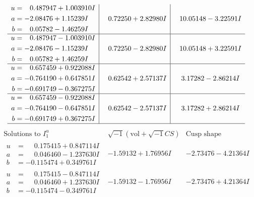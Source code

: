 \documentclass[1p]{elsarticle_modified}
\theoremstyle{definition}
\newcommand{\I}{\sqrt{-1}}
\begin{document}
$$\begin{array}{c|c|c}
\begin{aligned}
u &= \phantom{-}0.487947 + 1.003910 I \\
a &= -2.08476 + 1.15239 I \\
b &= \phantom{-}0.05782 - 1.46259 I\end{aligned}
 & \phantom{-}0.72250 + 2.82980 I & \phantom{-}10.05148 - 3.22591 I \\ \hline\begin{aligned}
u &= \phantom{-}0.487947 - 1.003910 I \\
a &= -2.08476 - 1.15239 I \\
b &= \phantom{-}0.05782 + 1.46259 I\end{aligned}
 & \phantom{-}0.72250 - 2.82980 I & \phantom{-}10.05148 + 3.22591 I \\ \hline\begin{aligned}
u &= \phantom{-}0.657459 + 0.922088 I \\
a &= -0.764190 + 0.647851 I \\
b &= -0.691749 - 0.367275 I\end{aligned}
 & \phantom{-}0.62542 + 2.57137 I & \phantom{-}3.17282 - 2.86214 I \\ \hline\begin{aligned}
u &= \phantom{-}0.657459 - 0.922088 I \\
a &= -0.764190 - 0.647851 I \\
b &= -0.691749 + 0.367275 I\end{aligned}
 & \phantom{-}0.62542 - 2.57137 I & \phantom{-}3.17282 + 2.86214 I\\
 \hline 
 \end{array}$$\newpage$$\begin{array}{c|c|c}  
\text{Solutions to }I^u_{1}& \I (\text{vol} + \sqrt{-1}CS) & \text{Cusp shape}\\
 \hline 
\begin{aligned}
u &= \phantom{-}0.175415 + 0.847114 I \\
a &= \phantom{-}0.046460 - 1.237630 I \\
b &= -0.115474 + 0.349761 I\end{aligned}
 & -1.59132 + 1.76956 I & -2.73476 - 4.21364 I \\ \hline\begin{aligned}
u &= \phantom{-}0.175415 - 0.847114 I \\
a &= \phantom{-}0.046460 + 1.237630 I \\
b &= -0.115474 - 0.349761 I\end{aligned}
 & -1.59132 - 1.76956 I & -2.73476 + 4.21364 I \\ \hline\begin{aligned}

\end{aligned}
\end{array}$$
\end{document}
